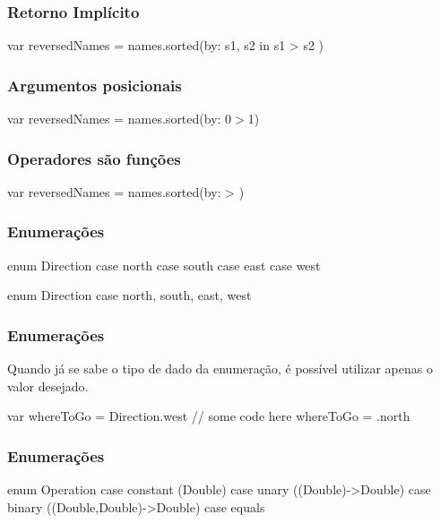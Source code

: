 \begin{frame}[fragile]
    \frametitle{Retorno Implícito}

    \begin{swift}
var reversedNames =
        names.sorted(by: { s1, s2 in s1 > s2 })
    \end{swift}
\end{frame}

\begin{frame}[fragile]
    \frametitle{Argumentos posicionais}

    \begin{swift}
var reversedNames = names.sorted(by: {$0 > $1})
    \end{swift}
\end{frame}

\begin{frame}[fragile]
    \frametitle{Operadores são funções}

    \begin{swift}
   var reversedNames = names.sorted(by: > )
    \end{swift}
\end{frame}

\begin{frame}[fragile]
    \frametitle{Enumerações}

    \begin{swift}
        enum Direction {
            case north
            case south
            case east
            case west
        }

        enum Direction {
            case north, south, east, west
        }
    \end{swift}
\end{frame}

\begin{frame}[fragile]
    \frametitle{Enumerações}

    Quando já se sabe o tipo de dado da enumeração, é possível
    utilizar apenas o valor desejado.
    \vspace{0.5cm}
    \begin{swift}
        var whereToGo = Direction.west
        // some code here
        whereToGo = .north
    \end{swift}
\end{frame}

\begin{frame}[fragile]
    \frametitle{Enumerações}

    \begin{swift}
  enum Operation {
      case constant (Double)
      case unary ((Double)->Double)
      case binary ((Double,Double)->Double)
      case equals
  }
    \end{swift}
\end{frame}

